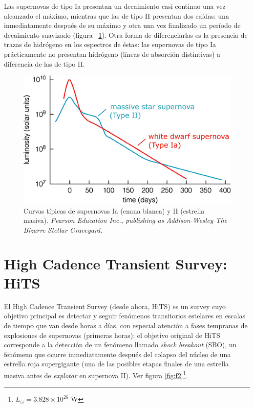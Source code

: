Las supernovas de tipo Ia presentan un decaimiento casi continuo una vez alcanzado el m\'aximo, mientras que las de tipo II presentan dos ca\'idas: una inmediatamente despu\'es de su m\'aximo y otra una vez finalizado un per\'iodo de decaimiento suavizado (figura ~\ref{fig:f1}). Otra forma de diferenciarlas es la presencia de trazas de hidr\'ogeno en los espectros de \'estas: las supernovas de tipo Ia pr\'acticamente no presentan hidr\'ogeno (l\'ineas de absorci\'on distintivas) a diferencia de las de tipo II.\bigskip

\begin{figure}[h!]
\centering
\includegraphics[scale=.8]{images/clear}
\caption{Curvas t\'ipicas de supernovas Ia (enana blanca) y II (estrella masiva). \textit{ Pearson Education Inc., publishing as Addison-Wesley The Bizarre Stellar Graveyard.}}
\label{fig:f1}
\end{figure}


\section{High Cadence Transient Survey: HiTS}

El High Cadence Transient Survey\cite{hits} (desde ahora, HiTS) es un survey cuyo objetivo principal es detectar y seguir fen\'omenos transitorios estelares en escalas de tiempo que van desde horas a d\'ias, con especial atenci\'on a fases tempranas de explosiones de supernovas (primeras horas): el objetivo original de HiTS corresponde a la detecci\'on de un fen\'omeno llamado \textit{shock breakout} (SBO), un fen\'omeno que ocurre inmediatamente despu\'es del colapso del n\'ucleo de una estrella roja supergigante (una de las posibles etapas finales de una estrella masiva antes de \textit{explotar} en supernova II). Ver figura \ref{fig:f2}\footnote{$L_{\odot}= 3.828 \times 10^{26}$ W}.

